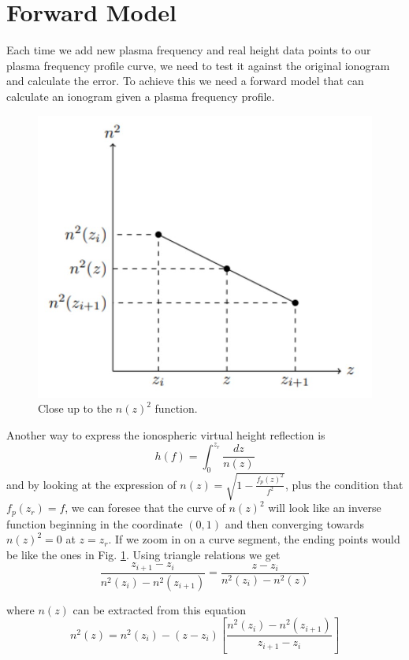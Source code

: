 \documentclass[aps,twocolumn,prb,showpacs,superscriptaddress]{revtex4-2}
\newcommand{\+}{\dagger}
\begin{document}
\section{Forward Model}
Each time we add new plasma frequency and real height data points to our plasma frequency profile curve, we need to test it against the original ionogram and calculate the error. To achieve this we need a forward model that can calculate an ionogram given a plasma frequency profile.

\begin{figure}[t]
    \begin{center}
    \includegraphics*[width=0.70\columnwidth]{images/grafiquito.jpg}
    \end{center}
    \caption{Close up to the $n(z)^2$ function.}
    \label{fig:grafiquito}
\end{figure}

Another way to express the ionospheric virtual height reflection is
\begin{equation}
h(f) = \int_0^{z_r} \frac{dz}{n(z)}
\label{eq:virtual_height}
\end{equation}
and by looking at the expression of \(n(z) = \sqrt{1 - \frac{f_p(z)^2}{f^2}}\), plus the condition that \(f_p(z_r) = f\), we can foresee that the curve of \(n(z)^2\) will look like an inverse function beginning in the coordinate \((0, 1)\) and then converging towards \(n(z)^2 = 0\) at \(z = z_r\). If we zoom in on a curve segment, the ending points would be like the ones in Fig. \ref{fig:grafiquito}. Using triangle relations we get
\begin{equation}
\frac{z_{i+1} - z_i}{n^2(z_i) - n^2(z_{i+1})} = \frac{z - z_i}{n^2(z_i) - n^2(z)}
\end{equation}

where \(n(z)\) can be extracted from this equation
\begin{equation}
n^2(z) = n^2(z_i) - (z - z_i) \left[\frac{n^2(z_i) - n^2(z_{i+1})}{z_{i+1} - z_i}\right]
\end{equation}
\end{document}
